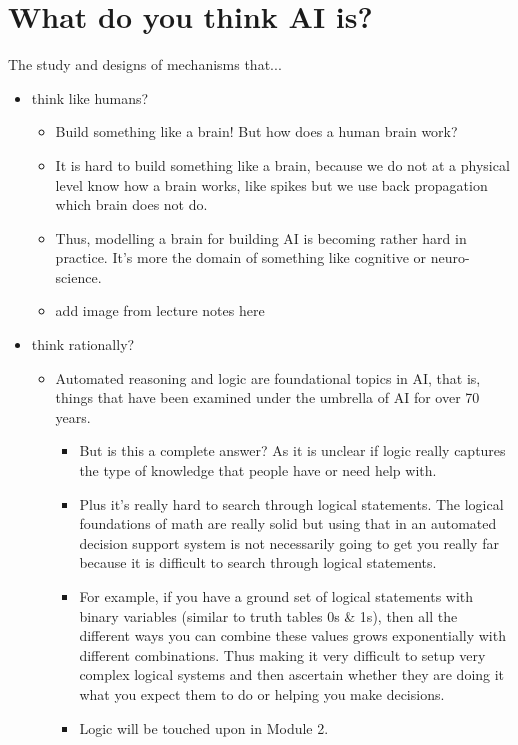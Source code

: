 \documentclass[12pt]{article}
\begin{document}
\section{What do you think AI is?}
The study and designs of mechanisms that...
\begin{itemize}
    \item think like humans? 
    \begin{itemize}
        \item Build something like a brain! But how does a human brain work?
        \item It is hard to build something like a brain, because we do not at a physical level know how a brain works, like spikes but we use back propagation which brain does not do.
        \item Thus, modelling a brain for building AI is becoming rather hard in practice. It's more the domain of something like cognitive or neuro-science.
        \item add image from lecture notes here
    \end{itemize}
    \item think rationally?
    \begin{itemize}
        \item Automated reasoning and logic are foundational topics in AI, that is, things that have been examined under the umbrella of AI for over 70 years.
        \begin{itemize}
            \item But is this a complete answer? As it is unclear if logic really captures the type of knowledge that people have or need help with.  
            \item Plus it's really hard to search through logical statements. The logical foundations of math are really solid but using that in an automated decision support system is not necessarily going to get you really far because it is difficult to search through logical statements.
            \item For example, if you have a ground set of logical statements with binary variables (similar to truth tables 0s \& 1s), then all the different ways you can combine these values grows exponentially with different combinations. Thus making it very difficult to setup very complex logical systems and then ascertain whether they are doing it what you expect them to do or helping you make decisions.
            \item Logic will be touched upon in Module 2.
        \end{itemize}

\end{itemize}
\end{itemize}
\end{document}
